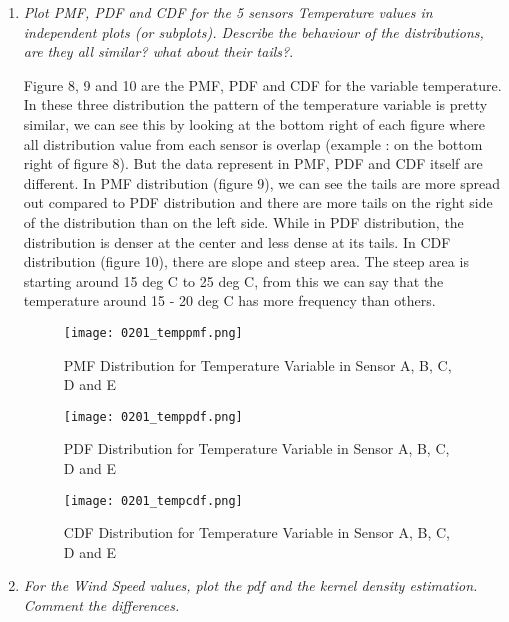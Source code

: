 \documentclass[a4paper,12pt]{article} %
\begin{document}
\begin{enumerate}

\item {\it Plot PMF, PDF and CDF for the 5 sensors Temperature values in independent plots (or subplots). Describe the behaviour of the distributions, are they all similar? what about their tails?}. %

Figure 8, 9 and 10 are the PMF, PDF and CDF for the variable temperature. In these three distribution the pattern of the temperature variable is pretty similar, we can see this by looking at the bottom right of each figure where all distribution value from each sensor is overlap (example : on the bottom right of figure 8). But the data represent in PMF, PDF and CDF itself are different. In PMF distribution (figure 9), we can see the tails are more spread out compared to PDF distribution and there are more tails on the right side of the distribution than on the left side. While in PDF distribution, the distribution is denser at the center and less dense at its tails. In CDF distribution (figure 10), there are slope and steep area. The steep area is starting around 15 deg C to 25 deg C, from this we can say that the temperature around 15 - 20 deg C has more frequency than others. 

\setlength{\belowcaptionskip}{-10pt}
\begin{figure}[H]
    \centering
    \texttt{[image: 0201\_temppmf.png]}
    \caption{PMF Distribution for Temperature Variable in Sensor A, B, C, D and E}
    \label{fig:my_label}
\end{figure}

\setlength{\belowcaptionskip}{-10pt}
\begin{figure}[H]
    \centering
    \texttt{[image: 0201\_temppdf.png]}
    \caption{PDF Distribution for Temperature Variable in Sensor A, B, C, D and E}
    \label{fig:my_label}
\end{figure}

\setlength{\belowcaptionskip}{-10pt}
\begin{figure}[H]
    \centering
    \texttt{[image: 0201\_tempcdf.png]}
    \caption{CDF Distribution for Temperature Variable in Sensor A, B, C, D and E}
    \label{fig:my_label}
\end{figure}

\item {\it For the Wind Speed values, plot the pdf and the kernel density estimation. Comment the differences.} %


\end{enumerate}
\end{document}

